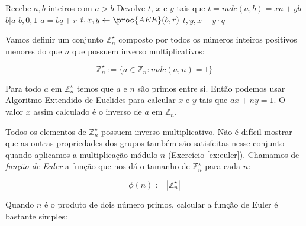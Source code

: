\begin{codebox}
\li \Comment Recebe $a, b$ inteiros com $a > b$
\li \Comment Devolve $t$, $x$ e $y$ tais que $t = mdc(a,b) = xa + yb$
\li \If $b|a$
\li     \Then
        \Return $b, 0, 1$
\li \Comment $a = bq + r$
\li \Else $t, x, y \gets \proc{AEE}(b, r)$
\li     \Return $t, y, x - y \cdot q$
\End
\end{codebox}

Vamos definir um conjunto $\mathbb{Z}_n^\star$ composto por todos os números inteiros positivos menores do que $n$ que possuem inverso multiplicativos:

\begin{displaymath}
  \mathbb{Z}_n^\star := \{a \in \mathbb{Z}_n : mdc(a,n) = 1\}
\end{displaymath}

Para todo $a$ em $\mathbb{Z}_n^\star$ temos que $a$ e $n$ são primos entre si.
Então podemos usar Algoritmo Extendido de Euclides para calcular $x$ e $y$ tais que $ax + ny = 1$.
O valor $x$ assim calculado é o inverso de $a$ em $\mathbb{Z}_n$.

Todos os elementos de $\mathbb{Z}_n^\star$ possuem inverso multiplicativo.
Não é difícil mostrar que as outras propriedades dos grupos também são satisfeitas nesse conjunto quando aplicamos a multiplicação módulo $n$ (Exercício \ref{ex:euler}).
Chamamos de {\em função de Euler} a função que nos dá o tamanho de $\mathbb{Z}_n^\star$ para cada $n$:

\begin{displaymath}
  \phi(n) := |\mathbb{Z}_n^\star|
\end{displaymath}

Quando $n$ é o produto de dois número primos, calcular a função de Euler é bastante simples:

